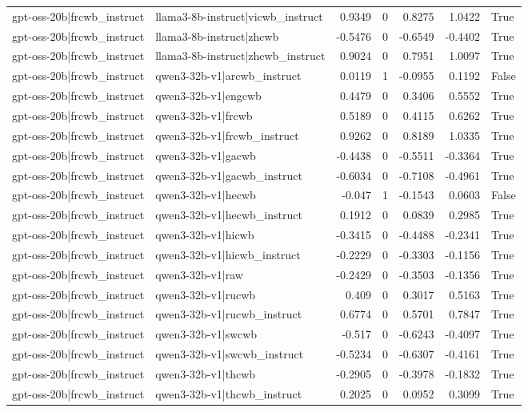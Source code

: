 \begin{table}
\begin{tabular}{l l r r r r l}
gpt-oss-20b|frcwb_instruct & llama3-8b-instruct|vicwb_instruct & 0.9349 & 0 & 0.8275 & 1.0422 & True \\
gpt-oss-20b|frcwb_instruct & llama3-8b-instruct|zhcwb & -0.5476 & 0 & -0.6549 & -0.4402 & True \\
gpt-oss-20b|frcwb_instruct & llama3-8b-instruct|zhcwb_instruct & 0.9024 & 0 & 0.7951 & 1.0097 & True \\
gpt-oss-20b|frcwb_instruct & qwen3-32b-v1|arcwb_instruct & 0.0119 & 1 & -0.0955 & 0.1192 & False \\
gpt-oss-20b|frcwb_instruct & qwen3-32b-v1|engcwb & 0.4479 & 0 & 0.3406 & 0.5552 & True \\
gpt-oss-20b|frcwb_instruct & qwen3-32b-v1|frcwb & 0.5189 & 0 & 0.4115 & 0.6262 & True \\
gpt-oss-20b|frcwb_instruct & qwen3-32b-v1|frcwb_instruct & 0.9262 & 0 & 0.8189 & 1.0335 & True \\
gpt-oss-20b|frcwb_instruct & qwen3-32b-v1|gacwb & -0.4438 & 0 & -0.5511 & -0.3364 & True \\
gpt-oss-20b|frcwb_instruct & qwen3-32b-v1|gacwb_instruct & -0.6034 & 0 & -0.7108 & -0.4961 & True \\
gpt-oss-20b|frcwb_instruct & qwen3-32b-v1|hecwb & -0.047 & 1 & -0.1543 & 0.0603 & False \\
gpt-oss-20b|frcwb_instruct & qwen3-32b-v1|hecwb_instruct & 0.1912 & 0 & 0.0839 & 0.2985 & True \\
gpt-oss-20b|frcwb_instruct & qwen3-32b-v1|hicwb & -0.3415 & 0 & -0.4488 & -0.2341 & True \\
gpt-oss-20b|frcwb_instruct & qwen3-32b-v1|hicwb_instruct & -0.2229 & 0 & -0.3303 & -0.1156 & True \\
gpt-oss-20b|frcwb_instruct & qwen3-32b-v1|raw & -0.2429 & 0 & -0.3503 & -0.1356 & True \\
gpt-oss-20b|frcwb_instruct & qwen3-32b-v1|rucwb & 0.409 & 0 & 0.3017 & 0.5163 & True \\
gpt-oss-20b|frcwb_instruct & qwen3-32b-v1|rucwb_instruct & 0.6774 & 0 & 0.5701 & 0.7847 & True \\
gpt-oss-20b|frcwb_instruct & qwen3-32b-v1|swcwb & -0.517 & 0 & -0.6243 & -0.4097 & True \\
gpt-oss-20b|frcwb_instruct & qwen3-32b-v1|swcwb_instruct & -0.5234 & 0 & -0.6307 & -0.4161 & True \\
gpt-oss-20b|frcwb_instruct & qwen3-32b-v1|thcwb & -0.2905 & 0 & -0.3978 & -0.1832 & True \\
gpt-oss-20b|frcwb_instruct & qwen3-32b-v1|thcwb_instruct & 0.2025 & 0 & 0.0952 & 0.3099 & True \\

\end{tabular}
\end{table}
